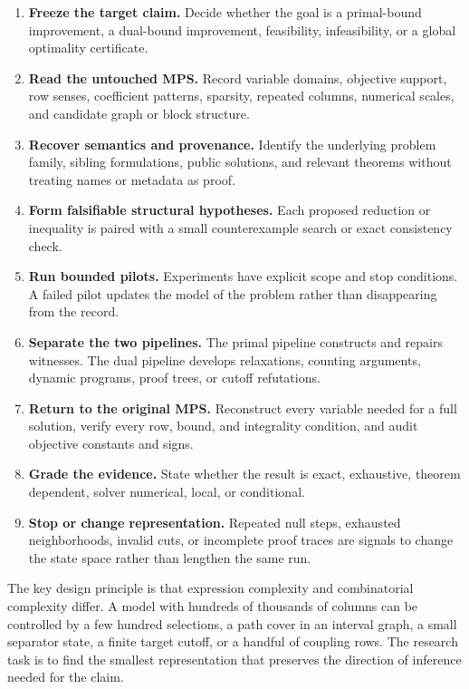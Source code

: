 \documentclass[11pt,letterpaper]{article}
\begin{document}
\begin{enumerate}
\item \textbf{Freeze the target claim.} Decide whether the goal is a primal-bound improvement, a dual-bound improvement, feasibility, infeasibility, or a global optimality certificate.
\item \textbf{Read the untouched MPS.} Record variable domains, objective support, row senses, coefficient patterns, sparsity, repeated columns, numerical scales, and candidate graph or block structure.
\item \textbf{Recover semantics and provenance.} Identify the underlying problem family, sibling formulations, public solutions, and relevant theorems without treating names or metadata as proof.
\item \textbf{Form falsifiable structural hypotheses.} Each proposed reduction or inequality is paired with a small counterexample search or exact consistency check.
\item \textbf{Run bounded pilots.} Experiments have explicit scope and stop conditions. A failed pilot updates the model of the problem rather than disappearing from the record.
\item \textbf{Separate the two pipelines.} The primal pipeline constructs and repairs witnesses. The dual pipeline develops relaxations, counting arguments, dynamic programs, proof trees, or cutoff refutations.
\item \textbf{Return to the original MPS.} Reconstruct every variable needed for a full solution, verify every row, bound, and integrality condition, and audit objective constants and signs.
\item \textbf{Grade the evidence.} State whether the result is exact, exhaustive, theorem dependent, solver numerical, local, or conditional.
\item \textbf{Stop or change representation.} Repeated null steps, exhausted neighborhoods, invalid cuts, or incomplete proof traces are signals to change the state space rather than lengthen the same run.
\end{enumerate}

The key design principle is that expression complexity and combinatorial complexity differ. A model with hundreds of thousands of columns can be controlled by a few hundred selections, a path cover in an interval graph, a small separator state, a finite target cutoff, or a handful of coupling rows. The research task is to find the smallest representation that preserves the direction of inference needed for the claim.
\end{document}
